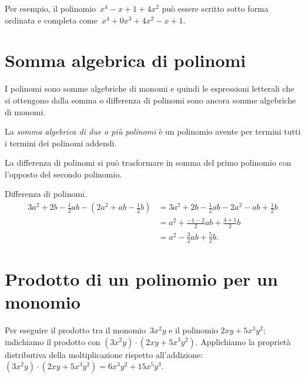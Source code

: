 Per esempio, il polinomio~$x^4−x+1+4x^2$ può essere scritto sotto forma ordinata e completa come~$x^4+0x^3+4x^2−x+1$.

\vspazio\ovalbox{\risolvii \ref{ese:10.4}, \ref{ese:10.5}, \ref{ese:10.6}, \ref{ese:10.7}, \ref{ese:10.8}, \ref{ese:10.9}, \ref{ese:10.10}}

\section{Somma algebrica di polinomi}

I polinomi sono somme algebriche di monomi e quindi le espressioni letterali che si ottengono dalla somma
o differenza di polinomi sono ancora somme algebriche di monomi.

\begin{definizione}
La \emph{somma algebrica di due o più polinomi} è un polinomio avente per termini tutti i termini dei polinomi addendi.
\end{definizione}

La differenza di polinomi si può trasformare in somma del primo polinomio con l'opposto del secondo polinomio.

\begin{exrig}
\begin{esempio}
Differenza di polinomi.
\begin{equation*}
\begin{split}
3a^2+2b-\frac{1}{2}ab-\left(2a^2+ab-\frac{1}{2}b\right)&=3a^2+2b-\frac{1}{2}ab-2a^2-ab+\frac{1}{2}b\\
&=a^2+\frac{-1-2}{2}ab+\frac{4+1}{2}b\\
&=a^2-\frac{3}{2}ab+\frac{5}{2}b.
\end{split}
\end{equation*}
\end{esempio}
\end{exrig}

\ovalbox{\risolvii \ref{ese:10.11}, \ref{ese:10.12}, \ref{ese:10.13}}

\section{Prodotto di un polinomio per un monomio}

Per eseguire il prodotto tra il monomio~$3x^{2}y$ e il polinomio
$2{xy}+5x^{3}y^{2}$; indichiamo il prodotto con
$\left(3x^{2}y\right)\cdot \left(2{xy}+5x^{3}y^{2}\right)$.
Applichiamo la proprietà distributiva della moltiplicazione rispetto
all'addizione:~$\left(3x^{2}y\right)\cdot
\left(2{xy}+5x^{3}y^{2}\right)=6x^{3}y^{2}+15x^{5}y^{3}$.

